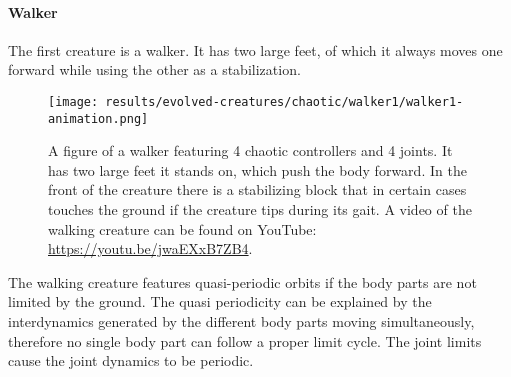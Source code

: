 \documentclass[main]{subfiles}
\begin{document}
\paragraph{Walker}
 
The first creature is a walker. It has two large feet, of which it always moves one forward while using the other as a stabilization. 

\begin{figure}[H]
\centering
\texttt{[image: results/evolved-creatures/chaotic/walker1/walker1-animation.png]}
\caption[Figure of a walker using chaotic controllers.]{A figure of a walker featuring 4 chaotic controllers and 4 joints. It has two large feet it stands on, which push the body forward. In the front of the creature there is a stabilizing block that in certain cases touches the ground if the creature tips during its gait. A video of the walking creature can be found on YouTube: \url{https://youtu.be/jwaEXxB7ZB4}.}
\label{figure:successfulcreatures-chaotic-walker1}
\end{figure}

The walking creature features quasi-periodic orbits if the body parts are not limited by the ground. %
%
The quasi periodicity can be explained by the interdynamics generated by the different body parts moving simultaneously, therefore no single body part can follow a proper limit cycle. %
%
The joint limits cause the joint dynamics to be periodic. %
\end{document}
